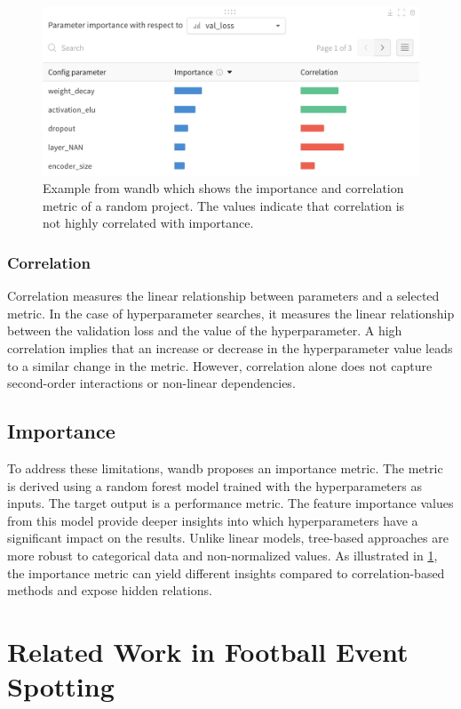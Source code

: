 \begin{figure}
    \centering
    \includegraphics[width=0.5\linewidth]{figures/image.png}
    \caption{Example from \acrshort{wandb}\cite{wandb_parameter_importance} which shows the importance and correlation metric of a random project. The values indicate that correlation is not highly correlated with importance.}
    \label{fig:importance_v_correlation}
\end{figure}

\subsubsection{Correlation}

Correlation measures the linear relationship between parameters and a selected metric. In the case of hyperparameter searches, it measures the linear relationship between the validation loss and the value of the hyperparameter. A high correlation implies that an increase or decrease in the hyperparameter value leads to a similar change in the metric. However, correlation alone does not capture second-order interactions or non-linear dependencies.

\subsection{Importance}

To address these limitations, \acrfull{wandb} proposes an importance metric. The metric is derived using a random forest model trained with the hyperparameters as inputs. The target output is a performance metric. The feature importance values from this model provide deeper insights into which hyperparameters have a significant impact on the results. Unlike linear models, tree-based approaches are more robust to categorical data and non-normalized values\cite{wandb_parameter_importance}. As illustrated in \cref{fig:importance_v_correlation}, the importance metric can yield different insights compared to correlation-based methods and expose hidden relations.

\section{Related Work in Football Event Spotting}
\label{sec:fw_work}

